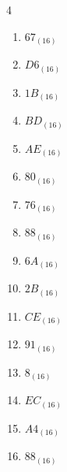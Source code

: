 \begin{multicols}{4}
\begin{enumerate}
  \item $67_{(16)}$

        \phantom{$=103$}

  \item $D6_{(16)}$

        \phantom{$=214$}

  \item $1B_{(16)}$

        \phantom{$=27$}

  \item $BD_{(16)}$

        \phantom{$=189$}

  \item $AE_{(16)}$

        \phantom{$=174$}

\columnbreak %

  \item $80_{(16)}$

        \phantom{$=128$}

  \item $76_{(16)}$

        \phantom{$=118$}

  \item $88_{(16)}$

        \phantom{$=136$}

  \item $6A_{(16)}$

        \phantom{$=106$}

  \item $2B_{(16)}$

        \phantom{$=43$}

  \item $CE_{(16)}$

        \phantom{$=206$}

  \item $91_{(16)}$

        \phantom{$=145$}

  \item $8_{(16)}$

        \phantom{$=8$}

  \item $EC_{(16)}$

        \phantom{$=236$}

  \item $A4_{(16)}$

        \phantom{$=164$}

  \item $88_{(16)}$


\end{enumerate}
\end{multicols}
